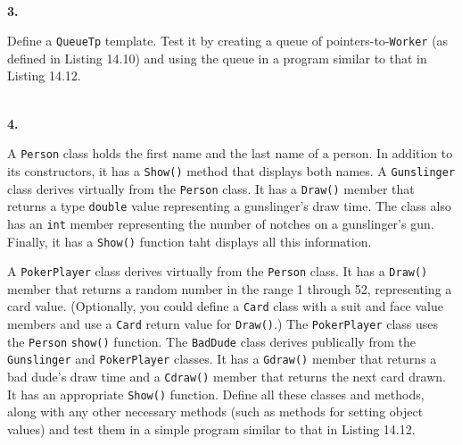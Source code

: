 \documentclass[10 pt]{amsart}
\newlength{\cwidth}
\newenvironment{cpart}[2][\cwidth]
	{%
		\\ %
		\textbf{#2. }%
		\begin{minipage}[t]{#1}%
		\setlength{\parindent}{0pt}%
		\setlength{\parskip}{2ex}%
	}
	{%
		\end{minipage}%
	}
\newcommand{\ttt}[1]{\texttt{#1}}
\begin{document}
	\begin{cpart}{3}
		Define a \ttt{QueueTp} template.
		Test it by creating a queue of pointers-to-\ttt{Worker}
		(as defined in Listing 14.10) and using the queue in a program
		similar to that in Listing 14.12.
	\end{cpart}

	\begin{cpart}{4}
		A \ttt{Person} class holds the first name and the last name of
		a person.
		In addition to its constructors, it has a \ttt{Show()} method
		that displays both names.
		A \ttt{Gunslinger} class derives virtually from the \ttt{Person}
		class.
		It has a \ttt{Draw()} member that returns a type \ttt{double}
		value representing a gunslinger's draw time.
		The class also has an \ttt{int} member representing the
		number of notches on a gunslinger's gun.
		Finally, it has a \ttt{Show()} function taht displays 	
		all this information.

		A \ttt{PokerPlayer} class derives virtually from the
		\ttt{Person} class.
		It has a \ttt{Draw()} member that returns a random number
		in the range 1 through 52, representing a card value.
		(Optionally, you could define a \ttt{Card} class with 
		a suit and face value members and use a \ttt{Card} return 
		value for \ttt{Draw()}.)
		The \ttt{PokerPlayer} class uses the \ttt{Person} \ttt{show()}
		function.
		The \ttt{BadDude} class derives publically from the
		\ttt{Gunslinger} and \ttt{PokerPlayer} classes.
		It has a \ttt{Gdraw()} member that returns a bad dude's 
		draw time and a \ttt{Cdraw()} member that returns the
		next card drawn.
		It has an appropriate \ttt{Show()} function.
		Define all these classes and methods, along with any other
		necessary methods (such as methods for setting object values)
		and test them in a simple program similar to that in Listing
		14.12.
	\end{cpart}
\end{document}
